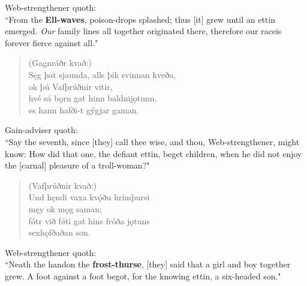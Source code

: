 \bvb Web-strengthener quoth: \\ “From the \textbf{Ell-waves}, poison-drops splashed; thus [it] grew until an ettin emerged. \emph{Our} family lines all together originated there, therefore our race\footnotemark[45] is forever fierce against all.\footnotemark[46]" \\

\begin{verse}
(Gagnráðr kvað:) \\%
\bva Sęg þat sjaunda, \hld alls þik svinnan kveða, \\%
\ind ok þú Vafþrúðnir vitir, \\%
hvé sá bǫrn gat \hld hinn baldni\footnotemark[25] jǫtunn, \\%
\ind es hann hafði-t gýgjar gaman.\\%
\end{verse}

\bvb Gain-adviser quoth: \\ “Say the seventh, since [they] call thee wise, and thou, Web-strengthener, might know: How did that one, the defiant ettin, beget children, when he did not enjoy the [carnal] pleasure of a troll-woman?" \\

\begin{verse}
(Vafþrúðnir kvað:) \\%
\bva Und hęndi vaxa \hld kvǫ́ðu hrímþursi \\%
\ind męy ok mǫg saman; \\%
fótr við fǿti \hld gat hins fróða jǫtuns \\%
\ind sexhǫfðaðan son.\\%
\end{verse}

\bvb Web-strengthener quoth: \\ “Neath the hand\footnotemark[50] on the \textbf{frost-thurse}, [they] said that a girl and boy together grew. A foot against a foot begot, for the knowing ettin, a six-headed son." \\

